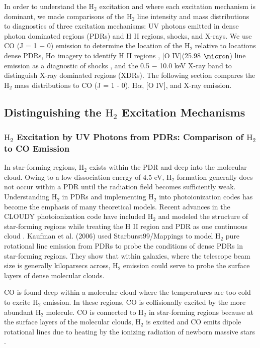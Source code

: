\documentclass[manuscript]{aastex}
\begin{document}
In order to understand the $\mathrm{H_2}$ excitation and where each excitation mechanism is dominant, we made comparisons of the $\mathrm{H_2}$ line intensity and mass distributions to diagnostics of three excitation mechanisms: UV photons emitted in dense photon dominated regions (PDRs) and H II regions, shocks, and X-rays.  We use CO (J = 1 $-$ 0) emission to determine the location of the $\mathrm{H_2}$ relative to locations dense PDRs, H$\alpha$ imagery to identify H II regions \citep{sco01}, [O IV](25.98 $\micron$) line emission as a diagnostic of shocks \citep{ss99}, and the 0.5 $-$ 10.0 keV X-ray band to distinguish X-ray dominated regions (XDRs).  The following section compares the $\mathrm{H_2}$ mass distributions to CO (J = 1 - 0), H$\alpha$, [O IV], and X-ray emission.

\subsection{Distinguishing the $\mathrm{H_2}$ Excitation Mechanisms}

\subsubsection{$\mathrm{H_2}$ Excitation by UV Photons from PDRs: Comparison of $\mathrm{H_2}$ to CO Emission}

In star-forming regions, $\mathrm{H_2}$ exists within the PDR and deep into the molecular cloud.  Owing to a low dissociation energy of 4.5 eV, $\mathrm{H_2}$ formation generally does not occur within a PDR until the radiation field  becomes sufficiently weak.  Understanding $\mathrm{H_2}$ in PDRs and implementing $\mathrm{H_2}$ into photoionization codes has become the emphasis of many theoretical models.  Recent advances in the CLOUDY photoionization code have included $\mathrm{H_2}$ and modeled the structure of star-forming regions while treating the H II region and PDR as one continuous cloud \citep{shaw05, abel05}.  Kaufman et al. (2006) used Starburst99/Mappings to model $\mathrm{H_2}$ pure rotational line emission from PDRs to probe the conditions of dense PDRs in star-forming regions.  They show that within galaxies, where the telescope beam size is generally kiloparsecs across, $\mathrm{H_2}$ emission could serve to probe the surface layers of dense molecular clouds.

CO is found deep within a molecular cloud where the temperatures are too cold to excite $\mathrm{H_2}$ emission.  In these regions, CO is collisionally excited by the more abundant $\mathrm{H_2}$ molecule.  CO is connected to $\mathrm{H_2}$ in star-forming regions because at the surface layers of the molecular clouds, $\mathrm{H_2}$ is excited and CO emits dipole rotational lines due to heating by the ionizing radiation of newborn massive stars \citep{all04}. 
\end{document}
